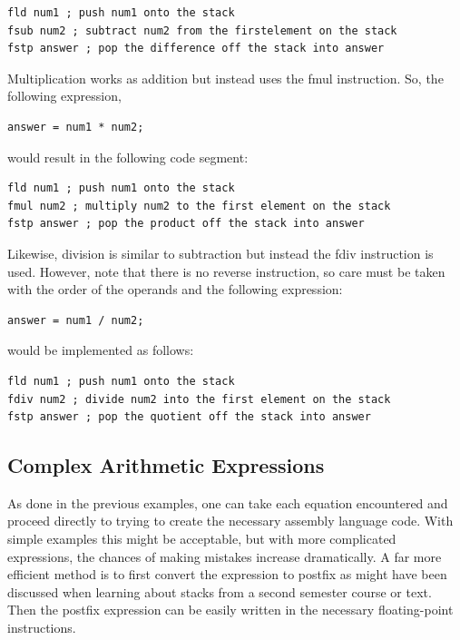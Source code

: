 \documentclass[10pt]{book}
\begin{document}
\begin{verbatim}
fld num1 ; push num1 onto the stack
fsub num2 ; subtract num2 from the firstelement on the stack
fstp answer ; pop the difference off the stack into answer
\end{verbatim}

Multiplication works as addition but instead uses the fmul instruction. So, the following expression,

\begin{verbatim}
answer = num1 * num2;
\end{verbatim}

would result in the following code segment:

\begin{verbatim}
fld num1 ; push num1 onto the stack
fmul num2 ; multiply num2 to the first element on the stack
fstp answer ; pop the product off the stack into answer
\end{verbatim}

Likewise, division is similar to subtraction but instead the fdiv instruction is used. However, note that there is no reverse instruction, so care must be taken with the order of the operands and the following expression:

\begin{verbatim}
answer = num1 / num2;
\end{verbatim}

would be implemented as follows:

\begin{verbatim}
fld num1 ; push num1 onto the stack
fdiv num2 ; divide num2 into the first element on the stack
fstp answer ; pop the quotient off the stack into answer
\end{verbatim}

\subsection{Complex Arithmetic Expressions}
As done in the previous examples, one can take each equation encountered and proceed directly to trying to create the necessary assembly language code. With simple examples this might be acceptable, but with more complicated expressions, the chances of making mistakes increase dramatically. A far more efficient method is to first convert the expression to postfix as might have been discussed when learning about stacks from a second semester course or text. Then the postfix expression can be easily written in the necessary floating-point instructions.
\end{document}
